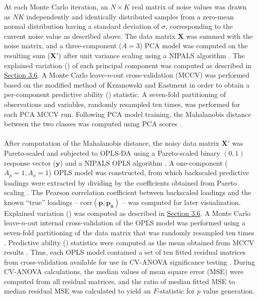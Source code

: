 \begin{doublespace}
At each Monte Carlo iteration, an $N \times K$ real matrix of noise values was
drawn as $NK$ independently and identically distributed samples from a
zero-mean normal distribution having a standard deviation of $\sigma$,
corresponding to the current noise value as described above. The data matrix
$\mathbf{X}$ was summed with the noise matrix, and a three-component ($A = 3$)
PCA model was computed on the resulting sum ($\mathbf{X'}$) after unit variance
scaling \cite{vandenberg:bmcg2006} using a NIPALS algorithm
\cite{jolliffe2002}. The explained variation (\rsq{}) of each principal
component was computed as described in \hyperlink{section.3.6}{Section 3.6}.
A Monte Carlo leave-$n$-out cross-validation (MCCV) was performed based on the
modified method of Krzanowski and Eastment \cite{eshghi:cils2014} in order to
obtain a per-component predictive ability (\qsq{}) statistic. A seven-fold
partitioning of observations and variables, randomly resampled ten times, was
performed for each PCA MCCV run. Following PCA model training, the Mahalanobis
distance between the two classes was computed using PCA scores
\cite{demaesschalck:cils2000}.
\\\\
After computation of the Mahalanobis distance, the noisy data matrix
$\mathbf{X'}$ was Pareto-scaled and subjected to OPLS-DA using a Pareto-scaled
binary $(0,1)$ response vector ($\mathbf{y}$) and a NIPALS OPLS algorithm
\cite{trygg:jchemo2002}. A one-component ($A_p = 1, A_o = 1$) OPLS model was
constructed, from which backscaled predictive loadings were extracted by
dividing by the coefficients obtained from Pareto scaling
\cite{cloarec:anchem2005b}. The Pearson correlation coefficient between
backscaled loadings and the known ``true'' loadings --
$\mathrm{corr}(\mathbf{p},\mathbf{p_0})$ -- was computed for later
visualization. Explained variation (\rsqy{}) was computed as described in
\hyperlink{section.3.6}{Section 3.6}. A Monte Carlo leave-$n$-out internal
cross-validation of the OPLS model was performed using a seven-fold
partitioning of the data matrix that was randomly resampled ten times
\cite{xu:cils2001}. Predictive ability (\dqsq{}) statistics were computed as
the mean \dqsq{} obtained from MCCV results \cite{westerhuis:metab2008b}.
Thus, each OPLS model contained a set of ten fitted residual matrices from
cross-validation available for use in CV-ANOVA significance testing
\cite{eriksson:jchemo2008}. During CV-ANOVA calculations, the median values
of mean square error (MSE) were computed from all residual matrices, and the
ratio of median fitted MSE to median residual MSE was calculated to yield an
$F$-statistic for $p$ value generation.
\end{doublespace}


